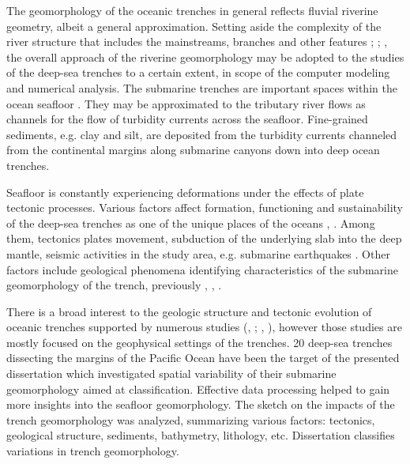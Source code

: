 \documentclass[11pt,a4paper]{report}
\begin{document}
{The geomorphology of the oceanic trenches in general reflects fluvial riverine geometry, albeit a general approximation. Setting aside the complexity of the river structure that includes the mainstreams, branches and other features \cite{Rosgen1994}; \cite{Stricketal2018}; \cite{Theiling1998}, the overall approach of the riverine geomorphology may be adopted to the studies of the deep-sea trenches to a certain extent, in scope of the computer modeling and numerical analysis. The submarine trenches are important spaces within the ocean seafloor \cite{DeLeoetal2010}. They may be approximated to the tributary river flows as channels for the flow of turbidity currents across the seafloor. Fine-grained sediments, e.g. clay and silt, are deposited from the turbidity currents channeled from the continental margins along submarine canyons down into deep ocean trenches. 

Seafloor is constantly experiencing deformations under the effects of plate tectonic processes. Various factors affect formation, functioning and sustainability of the deep-sea trenches as one of the unique places of the oceans \cite{Pollnacetal2001}, \cite{Pelletier}. Among them, tectonics plates movement, subduction of the underlying slab into the deep mantle, seismic activities in the study area, e.g. submarine earthquakes \cite{Shepard1963}. Other factors include geological phenomena identifying characteristics of the submarine geomorphology of the trench, previously \cite{Tibaldi}, \cite{Yogodzinski}, \cite{Munker}. 

There is a broad interest to the geologic structure and tectonic evolution of oceanic trenches supported by numerous studies (\cite{OdaSenna1994}, \cite{Larsen1968}; \cite{Oharaetal2002}, \cite{Hiranoetal2002}), however those studies are mostly focused on the geophysical settings of the trenches. 20 deep-sea trenches dissecting the margins of the Pacific Ocean have been the target of the presented dissertation which investigated spatial variability of their submarine geomorphology aimed at classification. Effective data processing helped to gain more insights into the seafloor geomorphology. The sketch on the impacts of the trench geomorphology was analyzed, summarizing various factors: tectonics, geological structure, sediments, bathymetry, lithology, etc. Dissertation classifies variations in trench geomorphology. 

\pagebreak
}
\end{document}
